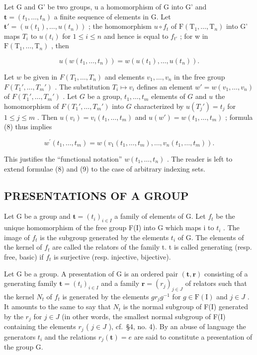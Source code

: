 Let G and G' be two groups, u a homomorphism of G into G' and \(\mathbf{t} = (t_{1}, \ldots, t_{n})\) a finite sequence of elements in G. Let \(\mathbf{t}' = (u(t_{1}), \ldots, u(t_{n}))\) ; the homomorphism \(u \circ f_{t}\) of \(\mathrm{F}(\mathrm{T}_{1}, \ldots, \mathrm{T}_{n})\) into G' maps \(T_{i}\) to \(u(t_{i})\) for \(1 \leqslant i \leqslant n\) and hence is equal to \(f_{t'}\) ; for w in \(\mathrm{F}(\mathrm{T}_{1}, \ldots, \mathrm{T}_{n})\) , then

\[
u (w (t _ {1}, \dots , t _ {n})) = w (u (t _ {1}), \dots , u (t _ {n})).\tag{8}
\]

Let \(w\) be given in \(F(T_1, \ldots, T_n)\) and elements \(v_1, \ldots, v_n\) in the free group \(F(T_1', \ldots, T_m')\) . The substitution \(T_i \mapsto v_i\) defines an element \(w' = w(v_1, \ldots, v_n)\) of \(F(T_1', \ldots, T_m')\) . Let \(G\) be a group, \(t_1, \ldots, t_m\) elements of \(G\) and \(u\) the homomorphism of \(F(T_1', \ldots, T_m')\) into \(G\) characterized by \(u(T_j') = t_j\) for \(1 \leqslant j \leqslant m\) . Then \(u(v_i) = v_i(t_1, \ldots, t_m)\) and \(u(w') = w(t_1, \ldots, t_m)\) ; formula (8) thus implies

\[
w ^ {\prime} (t _ {1}, \dots , t _ {m}) = w (v _ {1} (t _ {1}, \dots , t _ {m}), \dots , v _ {n} (t _ {1}, \dots , t _ {m})).\tag{9}
\]

This justifies the ``functional notation'' \(w(t_{1},\ldots,t_{n})\) . The reader is left to extend formulae (8) and (9) to the case of arbitrary indexing sets.

\subsection{PRESENTATIONS OF A GROUP}

Let G be a group and \(\mathbf{t} = (t_{i})_{i \in I}\) a family of elements of G. Let \(f_{t}\) be the unique homomorphism of the free group F(I) into G which maps i to \(t_{i}\) . The image of \(f_{t}\) is the subgroup generated by the elements \(t_{i}\) of G. The elements of the kernel of \(f_{t}\) are called the relators of the family t. t is called generating (resp. free, basic) if \(f_{t}\) is surjective (resp. injective, bijective).

Let G be a group. A presentation of G is an ordered pair \((\mathbf{t}, \mathbf{r})\) consisting of a generating family \(\mathbf{t} = (t_{i})_{i \in I}\) and a family \(\mathbf{r} = (r_{j})_{j \in J}\) of relators such that the kernel \(N_{t}\) of \(f_{t}\) is generated by the elements \(gr_{j}g^{-1}\) for \(g \in \mathrm{F}(\mathrm{I})\) and \(j \in J\) . It amounts to the same to say that \(N_{t}\) is the normal subgroup of F(I) generated by the \(r_{j}\) for \(j \in J\) (in other words, the smallest normal subgroup of F(I) containing the elements \(r_{j}\) ( \(j \in J\) ), cf.~§4, no. 4). By an abuse of language the generators \(t_{i}\) and the relations \(r_{j}(\mathbf{t}) = e\) are said to constitute a presentation of the group G.

